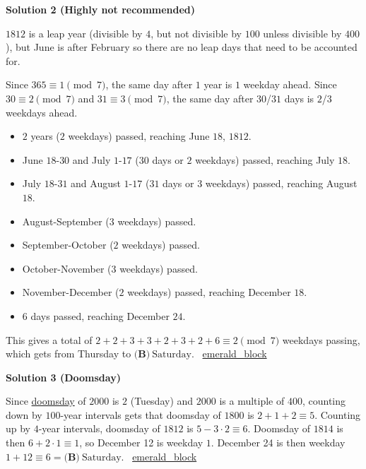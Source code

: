 \begin{enumerate}
\textbf{Solution 2 (Highly not recommended)}

$1812$ is a leap year (divisible by $4$, but not divisible by $100$ unless divisible by $400$), but June is after February so there are no leap days that need to be accounted for.

 Since $365 \equiv 1 \pmod{7}$, the same day after $1$ year is $1$ weekday ahead. Since $30 \equiv 2 \pmod{7}$ and $31 \equiv 3 \pmod{7}$, the same day after $30$/$31$ days is $2$/$3$ weekdays ahead.

 
            \begin{itemize}
        \item $2$ years ($2$ weekdays) passed, reaching June $18$, $1812$.
        \item June $18$-$30$ and July $1$-$17$ ($30$ days or $2$ weekdays) passed, reaching July $18$.
        \item July $18$-$31$ and August $1$-$17$ ($31$ days or $3$ weekdays) passed, reaching August $18$.
        \item August-September ($3$ weekdays) passed.
        \item September-October ($2$ weekdays) passed.
        \item October-November ($3$ weekdays) passed.
        \item November-December ($2$ weekdays) passed, reaching December $18$.
        \item $6$ days passed, reaching December $24$.
            \end{itemize}
            This gives a total of $2+2+3+3+2+3+2+6 \equiv 2 \pmod{7}$ weekdays passing, which gets from Thursday to $\boxed{\textbf{(B)}\ \text{Saturday}}$. ~\href{https://artofproblemsolving.com/wiki/index.php?title=User:Emerald\_block}{emerald\_block}

 



\textbf{Solution 3 (Doomsday)}

Since \href{https://en.wikipedia.org/wiki/Doomsday\_rule}{doomsday} of $2000$ is $2$ (Tuesday) and $2000$ is a multiple of $400$, counting down by $100$-year intervals gets that doomsday of $1800$ is $2+1+2 \equiv 5$. Counting up by $4$-year intervals, doomsday of $1812$ is $5-3\cdot2 \equiv 6$. Doomsday of $1814$ is then $6+2\cdot1 \equiv 1$, so December 12 is weekday $1$. December 24 is then weekday $1+12 \equiv 6 = \boxed{\textbf{(B)}\ \text{Saturday}}$. ~\href{https://artofproblemsolving.com/wiki/index.php?title=User:Emerald\_block}{emerald\_block}


\end{enumerate}
